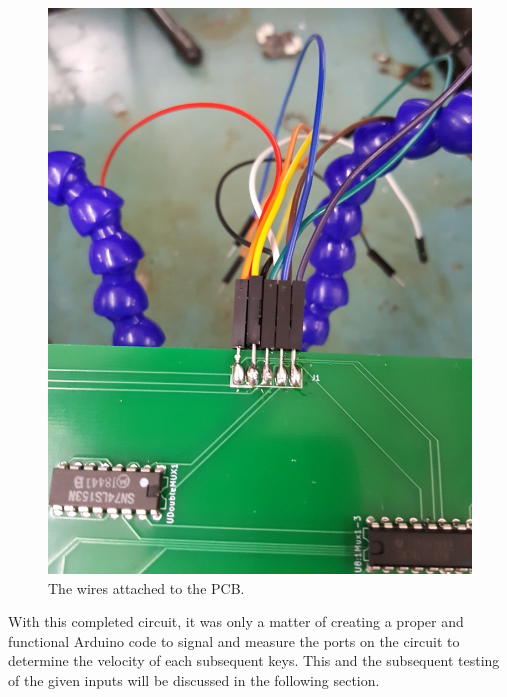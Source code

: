 \begin{figure}[h!]
  \centering
  \includegraphics[width=\linewidth]{image/pcbwires.jpg}
  \caption{The wires attached to the PCB.}
\end{figure}

With this completed circuit, it was only a matter of creating a proper and functional
Arduino code to signal and measure the ports on the circuit to determine the velocity of
each subsequent keys. This and the subsequent testing of the given inputs will be
discussed in the following section.

